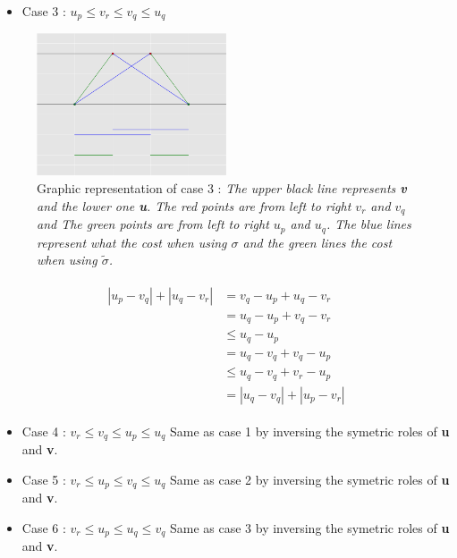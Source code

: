 \documentclass{article}
\begin{document}
\begin{itemize}
	\item Case 3 : $u_p\leq v_r \leq v_q \leq u_q$
	\end{itemize}
	
\begin{figure}
  \centering
    \includegraphics[width=0.5\textwidth]{demo_sort3.png}
     \caption{Graphic representation of case 3 : \emph{The upper black line represents \textbf{v} and the lower one \textbf{u}. The red points are from left to right $v_r$ and $v_q$ and The green points are from left to right $u_p$ and $u_q$. The blue lines represent what the cost when using $\sigma$ and the green lines  the cost when using $\tilde{\sigma}$. } }
\end{figure}	
	
	\begin{multline*}
	\begin{split}
	|u_p-v_q| + |u_q-v_r|	&=  v_q-u_p+u_q-v_r\\
		&=  u_q-u_p+v_q-v_r \\
	 	&\leq u_q-u_p\\
	 	&= u_q-v_q+v_q-u_p\\
	 	&\leq u_q-v_q+v_r-u_p\\
	 	&= |u_q-v_q|+|u_p-v_r|
	\end{split}
	\end{multline*}
	
	
	\begin{itemize}
	\item Case 4 : $v_r\leq v_q \leq u_p \leq u_q$\newline
	Same as case 1 by inversing the symetric roles of \textbf{u} and \textbf{v}.
	
	\item Case 5 : $v_r\leq u_p \leq v_q \leq u_q$\newline
	Same as case 2 by inversing the symetric roles of \textbf{u} and \textbf{v}.
	
	\item Case 6 : $v_r\leq u_p \leq u_q \leq v_q$\newline
	Same as case 3 by inversing the symetric roles of \textbf{u} and \textbf{v}.
	\end{itemize}
\end{document}
